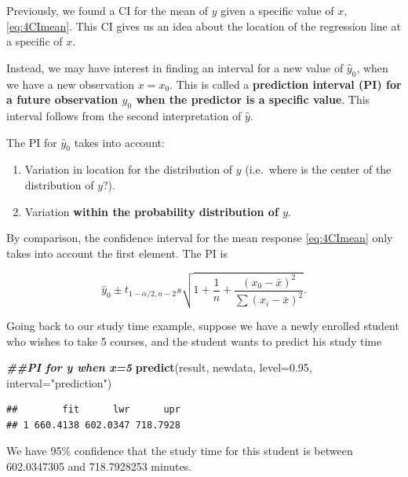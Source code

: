\documentclass[
]{book}
\newenvironment{Shaded}{\begin{snugshade}}{\end{snugshade}}
\newcommand{\AttributeTok}[1]{\textcolor[rgb]{0.13,0.29,0.53}{#1}}
\newcommand{\DocumentationTok}[1]{\textcolor[rgb]{0.56,0.35,0.01}{\textbf{\textit{#1}}}}
\newcommand{\FloatTok}[1]{\textcolor[rgb]{0.00,0.00,0.81}{#1}}
\newcommand{\FunctionTok}[1]{\textcolor[rgb]{0.13,0.29,0.53}{\textbf{#1}}}
\newcommand{\NormalTok}[1]{#1}
\newcommand{\StringTok}[1]{\textcolor[rgb]{0.31,0.60,0.02}{#1}}
\providecommand{\tightlist}{%
  \setlength{\itemsep}{0pt}\setlength{\parskip}{0pt}}
\begin{document}
Previously, we found a CI for the mean of \(y\) given a specific value of \(x\), \eqref{eq:4CImean}. This CI gives us an idea about the location of the regression line at a specific of \(x\).

Instead, we may have interest in finding an interval for a new value of \(\hat{y}_0\), when we have a new observation \(x=x_0\). This is called a \textbf{prediction interval (PI) for a future observation \(y_0\) when the predictor is a specific value}. This interval follows from the second interpretation of \(\hat{y}\).

The PI for \(\hat{y}_0\) takes into account:

\begin{enumerate}
\def\labelenumi{\arabic{enumi}.}
\tightlist
\item
  Variation in location for the distribution of \(y\) (i.e.~where is the center of the distribution of \(y\)?).
\item
  Variation \textbf{within the probability distribution of \(y\)}.
\end{enumerate}

By comparison, the confidence interval for the mean response \eqref{eq:4CImean} only takes into account the first element. The PI is

\begin{equation} 
\hat{y}_0\pm t_{1-\alpha/2,n-2}s \sqrt{1+\frac{1}{n} +
\frac{(x_0-\bar{x})^2}{\sum(x_i-\bar{x})^2}}.
\label{eq:4pred}
\end{equation}

Going back to our study time example, suppose we have a newly enrolled student who wishes to take 5 courses, and the student wants to predict his study time

\begin{Shaded}
\begin{Highlighting}[]
\DocumentationTok{\#\#PI for y when x=5}
\FunctionTok{predict}\NormalTok{(result, newdata, }\AttributeTok{level=}\FloatTok{0.95}\NormalTok{, }\AttributeTok{interval=}\StringTok{"prediction"}\NormalTok{)}
\end{Highlighting}
\end{Shaded}

\begin{verbatim}
##        fit      lwr      upr
## 1 660.4138 602.0347 718.7928
\end{verbatim}

We have 95\% confidence that the study time for this student is between 602.0347305 and 718.7928253 minutes.
\end{document}

